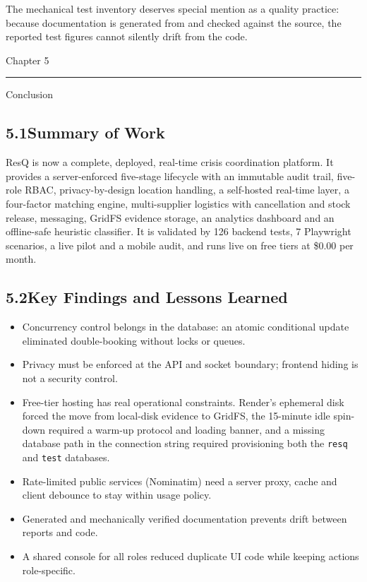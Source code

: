 \documentclass[11pt,a4paper]{article}
\newcommand{\chaptertitle}[2]{%
  \vspace*{0pt}%
  {\normalfont\fontsize{22}{25}\selectfont #1\par}%
  \vspace{2pt}%
  \noindent\rule{\textwidth}{0.7pt}\par
  \vspace{7pt}%
  {\normalfont\fontsize{22}{25}\selectfont #2\par}
  \vspace{5pt}%
}
\newcommand{\tc}[1]{\texttt{\small #1}}
\begin{document}
The mechanical test inventory deserves special mention as a quality practice: because documentation is generated from and checked against the source, the reported test figures cannot silently drift from the code.

\newpage

\label{ch5}
\chaptertitle{Chapter 5}{Conclusion}

\subsection{5.1\quad Summary of Work}\label{s51}

ResQ is now a complete, deployed, real-time crisis coordination platform. It provides a server-enforced five-stage lifecycle with an immutable audit trail, five-role RBAC, privacy-by-design location handling, a self-hosted real-time layer, a four-factor matching engine, multi-supplier logistics with cancellation and stock release, messaging, GridFS evidence storage, an analytics dashboard and an offline-safe heuristic classifier. It is validated by 126 backend tests, 7 Playwright scenarios, a live pilot and a mobile audit, and runs live on free tiers at \$0.00 per month.

\subsection{5.2\quad Key Findings and Lessons Learned}\label{s52}

\begin{itemize}
\item Concurrency control belongs in the database: an atomic conditional update eliminated double-booking without locks or queues.
\item Privacy must be enforced at the API and socket boundary; frontend hiding is not a security control.
\item Free-tier hosting has real operational constraints. Render's ephemeral disk forced the move from local-disk evidence to GridFS, the 15-minute idle spin-down required a warm-up protocol and loading banner, and a missing database path in the connection string required provisioning both the \tc{resq} and \tc{test} databases.
\item Rate-limited public services (Nominatim) need a server proxy, cache and client debounce to stay within usage policy.
\item Generated and mechanically verified documentation prevents drift between reports and code.
\item A shared console for all roles reduced duplicate UI code while keeping actions role-specific.
\end{itemize}
\end{document}
